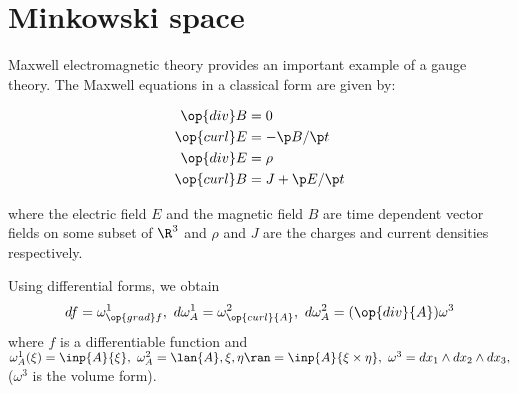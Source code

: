 \section{Minkowski space}

Maxwell electromagnetic theory provides an important example of a gauge theory.  The Maxwell equations in a classical form are given by:

\begin{align*}
\op{div} B&=0\\
\op{curl} E&= -\p B / \p t \\
\op{div} E &= \rho\\
\op{curl} B &= J + \p E / \p t
\end{align*}

where the electric field $E$ and the magnetic field $B$ are time dependent vector fields on some subset of $\R^{3}$ and $\rho$ and $J$ are the charges and current densities respectively.

Using differential forms, we obtain 
$$
df=\omega^{1}_{\op{grad}f}, \
d\omega^{1}_{{A}}=\omega^{2}_{\op{curl} {A}}, \
d\omega^{2}_{{A}}=(\op{div} {A} ) \omega^{3}
$$
where $f$ is a differentiable function and 
$
\omega^{1}_{{A}}(\xi)=\inp{A}{\xi}, \
\omega^{2}_{{A}}=\lan {A}, \xi, \eta \ran = \inp{{A}}{ \xi \times \eta}, \
\omega^{3}=dx_{1}\wedge dx_{2}\wedge dx_{3},
$
($\omega^{3}$ is the volume form).